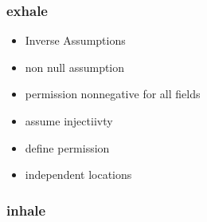 \documentclass[12pt]{article}
\begin{document}
\subsubsection{exhale}

\begin{itemize}
\item Inverse Assumptions
\item non null assumption
\item permission nonnegative for all fields
\item assume injectiivty
\item define permission
\item independent locations
\end{itemize}

\subsubsection{inhale}
\end{document}
